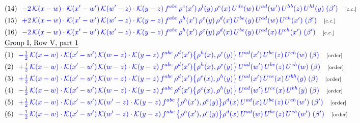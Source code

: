 \documentclass[9pt]{article}
\begin{document}
\begin{align}
&\quad\text{(14)}\ \ \textcolor{blue}{-2\,\mathcal{K}(x-w)\cdot\mathcal{K}(x'-w')\,\mathcal{K}(w'-z)\cdot\mathcal{K}(y-z)\, f^{abc}\,\rho^{c}(x')\,\rho^{l}(y)\,\rho^{e}(x)\,U^{de}(w)\,U^{ad}(w')\,U^{hb}(z)\,U^{hl}(y)\;(\beta')}\quad\text{\scriptsize[c.c.]}\notag\\
&\quad\text{(15)}\ \ \textcolor{blue}{+2\,\mathcal{K}(x-w)\cdot\mathcal{K}(x'-w')\,\mathcal{K}(w'-z)\cdot\mathcal{K}(y-z)\, f^{abc}\,\rho^{h}(x')\,\rho^{e}(y)\,\rho^{d}(x)\,U^{be}(y)\,U^{ad}(w)\,U^{ch}(x')\;(\beta')}\quad\text{\scriptsize[c.c.]}\notag\\
&\quad\text{(16)}\ \ \textcolor{blue}{-2\,\mathcal{K}(x-w)\cdot\mathcal{K}(x'-w')\,\mathcal{K}(w'-z)\cdot\mathcal{K}(y-z)\, f^{abc}\,\rho^{h}(x')\,\rho^{e}(y)\,\rho^{d}(x)\,U^{be}(y)\,U^{ad}(x)\,U^{ch}(x')\;(\beta')}\quad\text{\scriptsize[c.c.]}\notag\\
&\quad\underline{\text{Group I, Row V, part 1}}\notag\\
&\quad\text{(1)}\ \ \textcolor{blue}{-\tfrac12\,\mathcal{K}(x-w)\cdot\mathcal{K}(x'-w')\,\mathcal{K}(w-z)\cdot\mathcal{K}(y-z)\, f^{abc}\,\rho^{d}(x')\big\{\rho^{h}(x),\rho^{e}(y)\big\}\,U^{ad}(x')\,U^{be}(z)\,U^{ch}(w)\;(\beta)}\quad\text{\scriptsize[order]}\notag\\
&\quad\text{(2)}\ \ \textcolor{blue}{+\tfrac12\,\mathcal{K}(x-w)\cdot\mathcal{K}(x'-w')\,\mathcal{K}(w-z)\cdot\mathcal{K}(y-z)\, f^{abc}\,\rho^{d}(x')\big\{\rho^{h}(x),\rho^{e}(y)\big\}\,U^{ad}(w')\,U^{be}(z)\,U^{ch}(w)\;(\beta)}\quad\text{\scriptsize[order]}\notag\\
&\quad\text{(3)}\ \ \textcolor{blue}{+\tfrac12\,\mathcal{K}(x-w)\cdot\mathcal{K}(x'-w')\,\mathcal{K}(w-z)\cdot\mathcal{K}(y-z)\, f^{abc}\,\rho^{d}(x')\big\{\rho^{e}(x),\rho^{h}(y)\big\}\,U^{ad}(x')\,U^{ce}(x)\,U^{bh}(y)\;(\beta)}\quad\text{\scriptsize[order]}\notag\\
&\quad\text{(4)}\ \ \textcolor{blue}{-\tfrac12\,\mathcal{K}(x-w)\cdot\mathcal{K}(x'-w')\,\mathcal{K}(w-z)\cdot\mathcal{K}(y-z)\, f^{abc}\,\rho^{d}(x')\big\{\rho^{e}(x),\rho^{h}(y)\big\}\,U^{ad}(w')\,U^{ce}(x)\,U^{bh}(y)\;(\beta)}\quad\text{\scriptsize[order]}\notag\\
&\quad\text{(5)}\ \ \textcolor{blue}{+\tfrac12\,\mathcal{K}(x-w)\cdot\mathcal{K}(x'-w')\,\mathcal{K}(w'-z)\cdot\mathcal{K}(y-z)\, f^{abc}\,\big\{\rho^{h}(x'),\rho^{e}(y)\big\}\rho^{d}(x)\,U^{ad}(x)\,U^{be}(z)\,U^{ch}(w')\;(\beta')}\quad\text{\scriptsize[order]}\notag\\
&\quad\text{(6)}\ \ \textcolor{blue}{-\tfrac12\,\mathcal{K}(x-w)\cdot\mathcal{K}(x'-w')\,\mathcal{K}(w'-z)\cdot\mathcal{K}(y-z)\, f^{abc}\,\big\{\rho^{h}(x'),\rho^{e}(y)\big\}\rho^{d}(x)\,U^{ad}(w)\,U^{be}(z)\,U^{ch}(w')\;(\beta')}\quad\text{\scriptsize[order]}\notag\\

\end{align}
\end{document}
